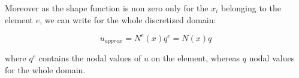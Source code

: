 	Moreover as the shape function is non zero only for the $x_i$ belonging to the element $e$, we can write for the whole discretized domain:
	
	\begin{equation}
	u_{approx} = N^e(x) q^e = N(x) q
	\end{equation}
	
	where $q^e$ contains the nodal values of $u$ on the element, whereas $q$ nodal values for the whole domain. 